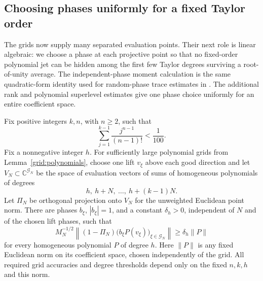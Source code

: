 \subsection{Choosing phases uniformly for a fixed Taylor order}

The grids now supply many separated evaluation points. Their next role
is linear algebraic: we choose a phase at each projective point so that
no fixed-order polynomial jet can be hidden among the first few Taylor
degrees surviving a root-of-unity average. The independent-phase moment
calculation is the same quadratic-form identity used for random-phase
trace estimates in \citet{IitakaEbisuzaki2004}.
The additional rank and polynomial superlevel estimates give one phase
choice uniformly for an entire coefficient space.

\begin{lemma}
\label{grid:phases}
Fix positive integers $k,n$, with $n\ge2$, such that
\begin{equation}
 \label{grid:dimension-choice}
 \sum_{j=1}^{k-1}\frac{j^{n-1}}{(n-1)!}<\frac1{100}.
\end{equation}
Fix a nonnegative integer $h$.  For sufficiently large polynomial
grids from Lemma~\ref{grid:polynomials}, choose one lift $v_\xi$
above each good direction and let $V_N\subset\mathbb C^{\mathcal G_N}$
be the space of evaluation vectors of sums of homogeneous
polynomials of degrees
\[
 h,\ h+N,\ \ldots,\ h+(k-1)N.
\]
Let $\Pi_N$ be orthogonal projection onto $V_N$ for the unweighted
Euclidean point norm.  There are phases $b_\xi$, $|b_\xi|=1$, and a
constant $\delta_h>0$, independent of $N$ and of the chosen lift
phases, such that
\begin{equation}
 \label{grid:phase-lower-bound}
 M_N^{-1/2}
 \left\|(1-\Pi_N)
       \bigl(b_\xi P(v_\xi)\bigr)_{\xi\in\mathcal G_N}\right\|
 \ge\delta_h\|P\|
\end{equation}
for every homogeneous polynomial $P$ of degree $h$.  Here $\|P\|$
is any fixed Euclidean norm on its coefficient space, chosen
independently of the grid.  All required grid accuracies and degree
thresholds depend only on the fixed $n,k,h$ and this norm.
\end{lemma}

